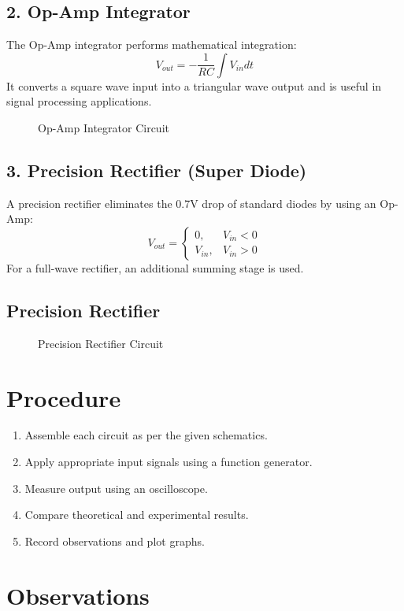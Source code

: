 \documentclass[a4paper,12pt]{article}
\begin{document}
\subsection*{2. Op-Amp Integrator}
The Op-Amp integrator performs mathematical integration:
\begin{equation}
V_{out} = -\frac{1}{RC} \int V_{in} dt
\end{equation}
It converts a square wave input into a triangular wave output and is useful in signal processing applications.
\begin{figure}[H]
    \centering
    
    \caption{Op-Amp Integrator Circuit}
\end{figure}
\subsection*{3. Precision Rectifier (Super Diode)}
A precision rectifier eliminates the 0.7V drop of standard diodes by using an Op-Amp:
\begin{equation}
V_{out} = \begin{cases} 0, & V_{in} < 0 \\ V_{in}, & V_{in} > 0 \end{cases}
\end{equation}
For a full-wave rectifier, an additional summing stage is used.
\subsection*{Precision Rectifier}
\begin{figure}[H]
    \centering
    
    \caption{Precision Rectifier Circuit}
\end{figure}
\section*{Procedure}
\begin{enumerate}
    \item Assemble each circuit as per the given schematics.
    \item Apply appropriate input signals using a function generator.
    \item Measure output using an oscilloscope.
    \item Compare theoretical and experimental results.
    \item Record observations and plot graphs.
\end{enumerate}

\section*{Observations}
\end{document}
